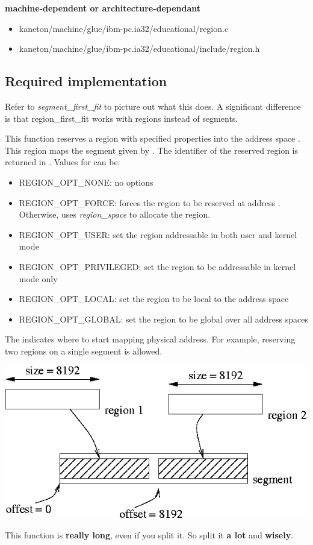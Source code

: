 {\color{filerefcolor} \textbf{machine-dependent or architecture-dependant}}
\begin{itemize}
\item kaneton/machine/glue/ibm-pc.ia32/educational/region.c
\item kaneton/machine/glue/ibm-pc.ia32/educational/include/region.h
\end{itemize}

\newpage
\subsection*{Required implementation}

{
  Refer to \textit{segment\_first\_fit} to picture out what this does. \newline
  A significant difference is that region\_first\_fit works with regions instead of segments.
}

{
  This function reserves a region with specified properties
  into the address space . This region maps the
  segment given by . The identifier of the reserved
  region is returned in .
  \newline
  Values for  can be:
  \begin{itemize}
  \item {REGION\_OPT\_NONE}: no options
  \item {REGION\_OPT\_FORCE}: forces the region to be reserved at address . Otherwise, uses \emph{region\_space} to allocate the region.
  \item {REGION\_OPT\_USER}: set the region addressable in both user and kernel mode
  \item {REGION\_OPT\_PRIVILEGED}: set the region to be addressable in kernel mode only
  \item {REGION\_OPT\_LOCAL}: set the region to be local to the address space
  \item {REGION\_OPT\_GLOBAL}: set the region to be global over all address spaces
  \end{itemize}

  The  indicates where to start mapping
  physical address. For example, reserving two regions on a
  single segment is allowed.
  \begin{center}
    \includegraphics[width=0.4\linewidth]{figures/offset}
  \end{center}

  This function is \textbf{really long}, even if you split it. So split it \textbf{a lot} and \textbf{wisely}.
}


